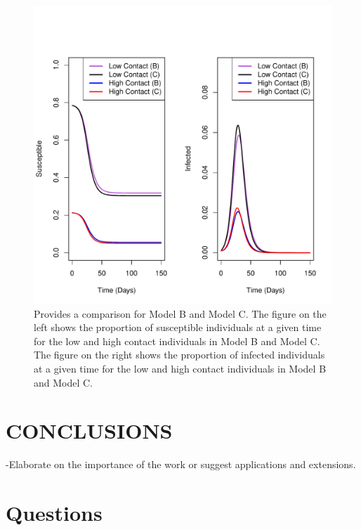\documentclass[a4paper, 12pt, journal]{ieeeconf}\usepackage[]{graphicx}\usepackage[]{color}
\makeatletter
\def\maxwidth{ %
  \ifdim\Gin@nat@width>\linewidth
    \linewidth
  \else
    \Gin@nat@width
  \fi
}
\newenvironment{knitrout}{}{} %
\makeatother
\begin{document}
\begin{knitrout}
\color{fgcolor}\begin{figure}[thpb]
\includegraphics[width=\maxwidth]{figure/R_BC-1} \caption{\label{fig:ModelC}Provides a comparison for Model B and Model C. The figure on the left shows the proportion of susceptible individuals at a given time for the low and high contact individuals in Model B and Model C. The figure on the right shows the proportion of infected individuals at a given time for the low and high contact individuals in Model B and Model C.}\label{fig:R_BC}
\end{figure}


\end{knitrout}


\section{CONCLUSIONS}
-Elaborate on the importance of the work or suggest applications and extensions. 

\addtolength{\textheight}{-12cm}   %

\section*{Questions}
\end{document}
